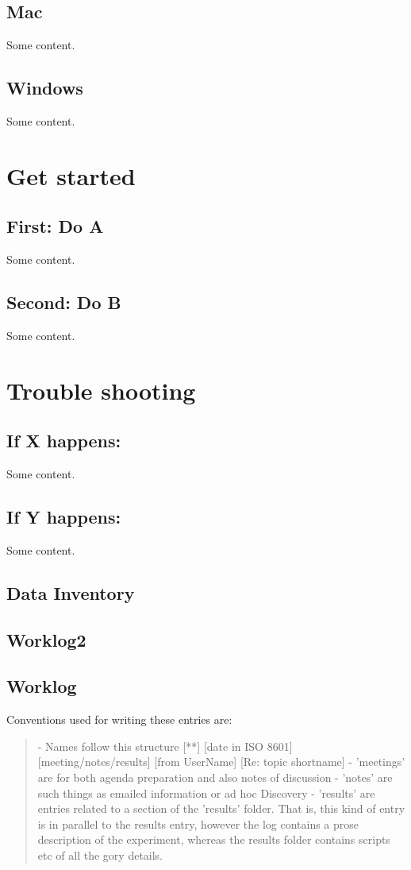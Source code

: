 \documentclass{article}
\begin{document}
\subsection*{Mac}\label{mac}
Some content.

\subsection*{Windows}\label{win}
Some content.
\clearpage
\section*{Get started}\label{start}
\subsection*{First: Do A}\label{caseA}
Some content.

\subsection*{Second: Do B}\label{caseB}
 Some content.
\clearpage
\section*{Trouble shooting}\label{trbl-shoot}
\subsection*{If X happens:}\label{caseX}
Some content.

\subsection*{If Y happens:}\label{caseY}
 Some content.

\subsection*{Data Inventory}\label{datinv}
\subsection*{Worklog2}\label{mac2}
\subsection*{Worklog}\label{mac3}

Conventions used for writing these entries are:
\begin{quote}
- Names follow this structure [**] [date in ISO 8601] [meeting/notes/results] [from UserName] [Re: topic shortname]
- 'meetings' are for both agenda preparation and also notes of discussion
- 'notes' are such things as emailed information or ad hoc Discovery
- 'results' are entries related to a section of the 'results' folder. 
  That is, this kind of entry is in parallel to the results entry,
  however the log contains a prose description of the experiment,
  whereas the results folder contains scripts etc of all the gory
  details.  
\end{quote}
\end{document}
